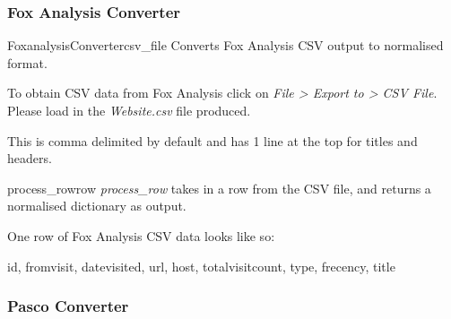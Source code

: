 \documentclass[letterpaper,10pt,english]{manual}
\begin{document}
\subsubsection{Fox Analysis Converter}
\hypertarget{module-webscavator.converters.foxanalysis}{}
\modulesynopsis{}

\hypertarget{webscavator.converters.foxanalysis.FoxanalysisConverter}{}\begin{classdesc}{FoxanalysisConverter}{csv\_file}
Converts Fox Analysis CSV output to normalised format.

To obtain CSV data from Fox Analysis click on \emph{File \textgreater{} Export to \textgreater{} CSV File}. Please load in 
the \emph{Website.csv} file produced.

This is comma delimited by default and has 1 line at the top for titles and headers.

\hypertarget{webscavator.converters.foxanalysis.FoxanalysisConverter.process_row}{}\begin{methoddesc}{process\_row}{row}
\emph{process\_row} takes in a row from the CSV file, and returns a normalised dictionary as output.

One row of Fox Analysis CSV data looks like so:

id, fromvisit, datevisited, url, host, totalvisitcount, type, frecency, title
\end{methoddesc}
\end{classdesc}

\resetcurrentobjects
\hypertarget{--doc-pasco}{}

\subsubsection{Pasco Converter}
\hypertarget{module-webscavator.converters.pasco}{}
\modulesynopsis{}
\end{document}
